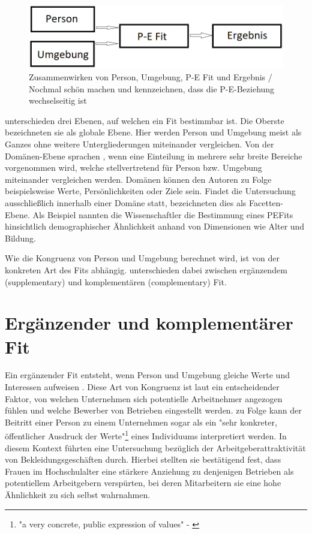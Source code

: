 \begin{figure}[h]
	\centering
	\includegraphics[width=1\textwidth]{gfx/P-E Fit.png}
	\caption{Zusammenwirken von Person, Umgebung, P-E Fit und Ergebnis / Nochmal schön machen und kennzeichnen, dass die P-E-Beziehung wechselseitig ist}
	\label{fig:personEnvironmentFit:einfuehrung:abb1}
\end{figure}
\newpage
\textcite[S. 6f.]{edwards:2007} unterschieden drei Ebenen, auf welchen ein Fit bestimmbar ist. Die Oberste bezeichneten sie als globale Ebene. Hier werden Person und Umgebung meist als Ganzes ohne weitere Untergliederungen miteinander vergleichen. Von der Domänen-Ebene sprachen \textcite[S. 7f.]{edwards:2007}, wenn eine Einteilung in mehrere sehr breite Bereiche vorgenommen wird, welche stellvertretend für Person bzw. Umgebung miteinander vergleichen werden. Domänen können den Autoren zu Folge beispielsweise Werte, Persönlichkeiten oder Ziele sein. Findet die Untersuchung ausschließlich innerhalb einer Domäne statt, bezeichneten \textcite[S. 7f.]{edwards:2007} dies als Facetten-Ebene. Als Beispiel nannten die Wissenschaftler die Bestimmung eines \acp{PEFit} hinsichtlich demographischer Ähnlichkeit anhand von Dimensionen wie Alter und Bildung.

Wie die Kongruenz von Person und Umgebung berechnet wird, ist von der konkreten Art des Fits abhängig. \textcite[S. 1]{muchinsky:1987} unterschieden dabei zwischen ergänzendem (supplementary) und komplementären (complementary) Fit.

\section{Ergänzender und komplementärer Fit}
\label{ch:personEnvironmentFit:supplementaryUndComplementary}
Ein ergänzender Fit entsteht, wenn Person und Umgebung gleiche Werte und Interessen aufweisen \cite[S. 2f.]{muchinsky:1987}. Diese Art von Kongruenz ist laut \textcite[S. 1ff.]{schneider:1987} ein entscheidender Faktor, von welchen Unternehmen sich potentielle Arbeitnehmer angezogen fühlen und welche Bewerber von Betrieben eingestellt werden. \textcite[S. 4, Z. 25f.]{popovich:1982} zu Folge kann der Beitritt einer Person zu einem Unternehmen sogar als ein "sehr konkreter, öffentlicher Ausdruck der Werte"\footnote{"a very concrete, public expression of values" - \textcite[S. 4, Z. 25f.]{popovich:1982}} eines Individuums interpretiert werden. In diesem Kontext führten \textcite[S. 7]{devendorf:2008} eine Untersuchung bezüglich der Arbeitgeberattraktivität von Bekleidungsgeschäften durch. Hierbei stellten sie bestätigend fest, dass Frauen im Hochschulalter eine stärkere Anziehung zu denjenigen Betrieben als potentiellem Arbeitgebern verspürten, bei deren Mitarbeitern sie eine hohe Ähnlichkeit zu sich selbst wahrnahmen.

